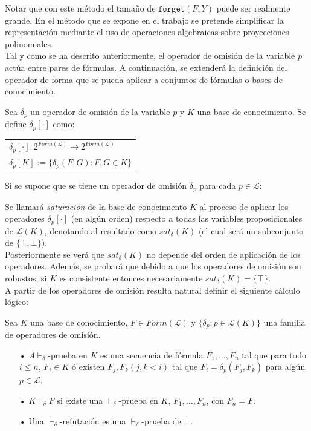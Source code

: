 \vspace{0.5cm}

Notar que con este método el tamaño de $\texttt{forget}(F,Y)$ puede ser realmente grande. En el método que se expone en el trabajo se pretende simplificar la representación mediante el uso de operaciones algebraicas sobre proyecciones polinomiales.\\

Tal y como se ha descrito anteriormente, el operador de omisión de la variable $p$ actúa entre pares de fórmulas. A continuación, se extenderá la definición del operador de forma que se pueda aplicar a conjuntos de fórmulas o bases de conocimiento.

 Sea $\delta_p$ un operador de omisión de la variable $p$ y $K$ una base de conocimiento. Se define $\delta_p [\cdot ]$ como:\\

\begin{tabular}{l}
$\delta_p [\cdot ] : 2^{Form(\mathcal{L})} \rightarrow 2^{Form(\mathcal{L})}$ \\
$\delta_p [K] := \{ \delta_p (F,G) : F,G \in K \}$
\end{tabular}

\vspace{0.5cm}

Si se supone que se tiene un operador de omisión $\delta_p$ para cada $p\in \mathcal{L}$:

 Se llamará \textit{saturación} de la base de conocimiento $K$ al proceso de aplicar los operadores $\delta_p [\cdot ]$ (en algún orden) respecto a todas las variables proposicionales de $\mathcal{L}(K)$, denotando al resultado como $sat_{\delta}(K)$ (el cual será un subconjunto de $\{ \top , \bot \}$).\\

Posteriormente se verá que $sat_{\delta}(K)$ no depende del orden de aplicación de los operadores. Además, se probará que debido a que los operadores de omisión son robustos, si $K$ es consistente entonces necesariamente $sat_{\delta}(K)=\{ \top \}$.\\

A partir de los operadores de omisión resulta natural definir el siguiente cálculo lógico:

 \label{def:prueba} Sea $K$ una base de conocimiento, $F\in Form(\mathcal{L})$ y $\{ \delta_p : p \in \mathcal{L}(K) \}$ una familia de operadores de omisión.
\begin{itemize}
\item[•] $A \vdash_{\delta}$-prueba en $K$ es una secuencia de fórmula $F_1, \dots ,F_n$ tal que para todo $i \leq n$, $F_i \in K$ ó existen $F_j , F_k (j,k < i)$ tal que $F_i = \delta_p (F_j , F_k)$ para algún $p \in \mathcal{L}$.
\item[•] $K \vdash_{\delta} F$ si existe una $\vdash_{\delta}$-prueba en $K$, $F_1, \dots ,F_n$, con $F_n = F$.
\item[•] Una $\vdash_{\delta}$-refutación es una $\vdash_{\delta}$-prueba de $\bot$.
\end{itemize}

